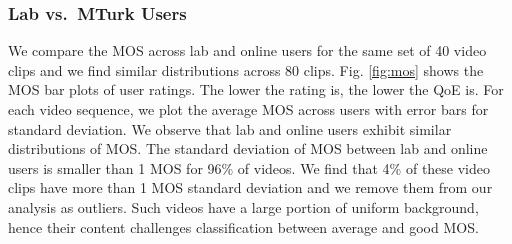 \subsubsection{Lab  vs.~MTurk Users}
We compare the MOS across lab and online users for the same set of 40 video clips and we find similar distributions across 80 clips. Fig. \ref{fig:mos} shows the MOS bar plots of user ratings. The lower the rating is, the lower the QoE is. For each video sequence, we plot the average MOS across users with error bars for standard deviation. We observe that lab and online users exhibit similar distributions of MOS. The standard deviation of MOS between lab and online users is smaller than 1 MOS for 96\% of videos. 
We find that 4\% of these video clips have more than 1 MOS standard deviation and we remove them from our analysis as outliers. Such videos have a  large portion of uniform background, hence their content challenges classification between average and good MOS.

